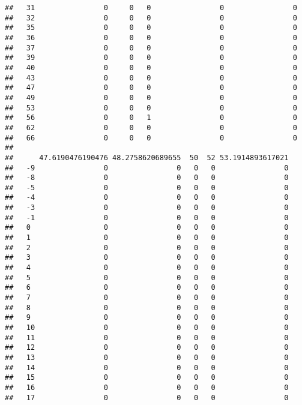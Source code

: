 \documentclass[]{article}
\begin{document}
\begin{verbatim}
##   31                0     0   0                0                0
##   32                0     0   0                0                0
##   35                0     0   0                0                0
##   36                0     0   0                0                0
##   37                0     0   0                0                0
##   39                0     0   0                0                0
##   40                0     0   0                0                0
##   43                0     0   0                0                0
##   47                0     0   0                0                0
##   49                0     0   0                0                0
##   53                0     0   0                0                0
##   56                0     0   1                0                0
##   62                0     0   0                0                0
##   66                0     0   0                0                0
##     
##      47.6190476190476 48.2758620689655  50  52 53.1914893617021
##   -9                0                0   0   0                0
##   -8                0                0   0   0                0
##   -5                0                0   0   0                0
##   -4                0                0   0   0                0
##   -3                0                0   0   0                0
##   -1                0                0   0   0                0
##   0                 0                0   0   0                0
##   1                 0                0   0   0                0
##   2                 0                0   0   0                0
##   3                 0                0   0   0                0
##   4                 0                0   0   0                0
##   5                 0                0   0   0                0
##   6                 0                0   0   0                0
##   7                 0                0   0   0                0
##   8                 0                0   0   0                0
##   9                 0                0   0   0                0
##   10                0                0   0   0                0
##   11                0                0   0   0                0
##   12                0                0   0   0                0
##   13                0                0   0   0                0
##   14                0                0   0   0                0
##   15                0                0   0   0                0
##   16                0                0   0   0                0
##   17                0                0   0   0                0

\end{verbatim}
\end{document}
